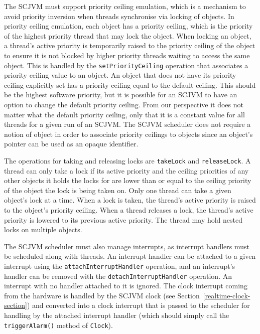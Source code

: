 The SCJVM must support priority ceiling emulation, which is a
mechanism to avoid priority inversion when threads synchronise via
locking of objects.
In priority ceiling emulation, each object has a priority ceiling,
which is the priority of the highest priority thread that may lock the
object.
When locking an object, a thread's active priority is temporarily
raised to the priority ceiling of the object to ensure it is not
blocked by higher priority threads waiting to access the same object.
This is handled by the \texttt{set\-Priority\-Ceiling} operation that
associates a priority ceiling value to an object.
An object that does not have its priority ceiling explicitly set has a
priority ceiling equal to the default ceiling.
This should be the highest software priority, but it is possible for
an SCJVM to have an option to change the default priority ceiling.
From our perspective it does not matter what the default priority
ceiling, only that it is a constant value for all threads
for a given run of an SCJVM.
The SCJVM scheduler does not require a notion of object in order to
associate priority ceilings to objects since an object's pointer can
be used as an opaque identifier.

The operations for taking and releasing locks are \texttt{takeLock}
and \texttt{releaseLock}.
A thread can only take a lock if its active priority and the ceiling
priorities of any other objects it holds the locks for are lower than
or equal to the ceiling priority of the object the lock is being taken
on.
Only one thread can take a given object's lock at a time.
When a lock is taken, the thread's active priority is raised to the
object's priority ceiling.
When a thread releases a lock, the thread's active priority is lowered
to its previous active priority.
The thread may hold nested locks on multiple objects.

The SCJVM scheduler must also manage interrupts, as interrupt handlers
must be scheduled along with threads.
An interrupt handler can be attached to a given interrupt using the
\texttt{attach\-Interrupt\-Handler} operation, and an interrupt's
handler can be removed with the \texttt{detach\-Interrupt\-Handler}
operation.
An interrupt with no handler attached to it is ignored.
The clock interrupt coming from the hardware is handled by the SCJVM
clock (see Section~\ref{realtime-clock-section}) and converted into a
clock interrupt that is passed to the scheduler for handling by the
attached interrupt handler (which should simply call the
\texttt{triggerAlarm()} method of \texttt{Clock}).

